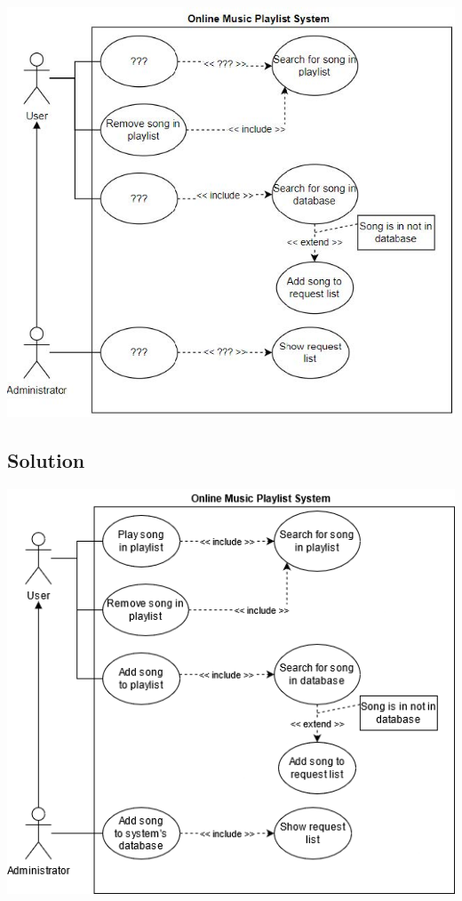 \documentclass{article}
\begin{document}
    \begin{center}
        \includegraphics[scale=0.6]{Exercise 02_ Practice Problems.jpg}
    \end{center}

    \subsection*{Solution}

    \begin{center}
        \includegraphics[scale=0.53]{Problem2.png}
    \end{center}
\end{document}
